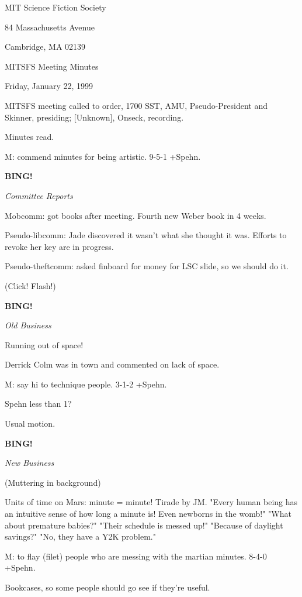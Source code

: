 \documentclass[12pt]{article}
\newcommand{\bing}{{\bf BING!} }
\newcommand{\goto}[1]{\bing \vskip 12pt \centerline{{\em{#1}}}}
\begin{document}
\begin{center}

MIT Science Fiction Society 

84 Massachusetts Avenue

Cambridge, MA 02139

\vspace{12pt}

MITSFS Meeting Minutes 

Friday, January 22, 1999

\end{center}
 
\vspace{18pt}

\setlength{\parskip}{6pt}

\noindent
MITSFS meeting called to order, 1700 SST,
AMU, Pseudo-President and Skinner, presiding; [Unknown], Onseck, recording.

Minutes read.

M: commend minutes for being artistic. 9-5-1 +Spehn.

\goto{Committee Reports}

Mobcomm: got books after meeting. Fourth new Weber book in 4 weeks.

Pseudo-libcomm: Jade discovered it wasn't what she thought it was. Efforts to revoke her key are in progress.

Pseudo-theftcomm: asked finboard for money for LSC slide, so we should do it.

(Click! Flash!)

\goto{Old Business}

Running out of space!

Derrick Colm was in town and commented on lack of space.

M: say hi to technique people. 3-1-2 +Spehn.

Spehn less than 1?

Usual motion.

\goto{New Business}

(Muttering in background)

Units of time on Mars: minute = minute! Tirade by JM. "Every human being has an intuitive sense of how long a minute is! Even newborns in the womb!" "What about premature babies?" "Their schedule is messed up!" "Because of daylight savings?" "No, they have a Y2K problem."

M: to flay (filet) people who are messing with the martian minutes. 8-4-0 +Spehn.

Bookcases, so some people should go see if they're useful.
\end{document}

